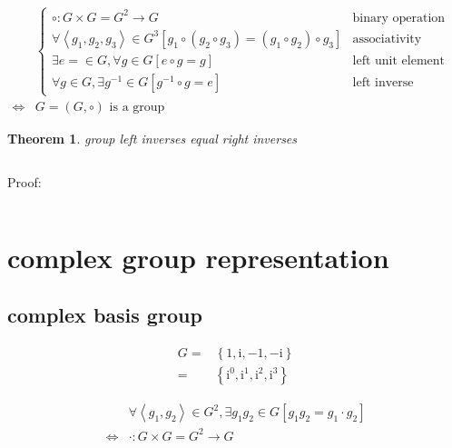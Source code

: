 \documentclass[
]{book}
\newtheorem{theorem}{Theorem}[chapter]
\theoremstyle{definition}
\theoremstyle{definition}
\theoremstyle{definition}
\theoremstyle{definition}
\theoremstyle{remark}
\begin{document}
\[
\begin{aligned}
 & \begin{cases}
\circ:G\times G=G^{2}\rightarrow G & \text{binary operation}\\
\forall\left\langle g_{{\scriptscriptstyle 1}},g_{{\scriptscriptstyle 2}},g_{{\scriptscriptstyle 3}}\right\rangle \in G^{3}\left[g_{{\scriptscriptstyle 1}}\circ\left(g_{{\scriptscriptstyle 2}}\circ g_{{\scriptscriptstyle 3}}\right)=\left(g_{{\scriptscriptstyle 1}}\circ g_{{\scriptscriptstyle 2}}\right)\circ g_{{\scriptscriptstyle 3}}\right] & \text{associativity}\\
\exists e=\in G,\forall g\in G\left[e\circ g=g\right] & \text{left unit element}\\
\forall g\in G,\exists g^{-1}\in G\left[g^{-1}\circ g=e\right] & \text{left inverse (element)}
\end{cases}\\
\Leftrightarrow & G=\left(G,\circ\right)\text{ is a group}
\end{aligned}
\]

\begin{theorem}
\protect\hypertarget{thm:unnamed-chunk-2}{}\label{thm:unnamed-chunk-2}group left inverses equal right inverses
\end{theorem}

\[
\
\]

Proof:

\[
\ \tag*{$\Box$}
\]

\section{complex group representation}\label{complex-group-representation}

\subsection{complex basis group}\label{complex-basis-group}

\[
\begin{aligned}
G= & \left\{ 1,\mathrm{i},-1,-\mathrm{i}\right\} \\
= & \left\{ \mathrm{i}^{0},\mathrm{i}^{1},\mathrm{i}^{2},\mathrm{i}^{3}\right\} 
\end{aligned}
\]

\[
\begin{aligned}
 & \forall\left\langle g_{{\scriptscriptstyle 1}},g_{{\scriptscriptstyle 2}}\right\rangle \in G^{2},\exists g_{{\scriptscriptstyle 1}}g_{{\scriptscriptstyle 2}}\in G\left[g_{{\scriptscriptstyle 1}}g_{{\scriptscriptstyle 2}}=g_{{\scriptscriptstyle 1}}\cdot g_{{\scriptscriptstyle 2}}\right]\\
\Leftrightarrow & \cdot:G\times G=G^{2}\rightarrow G
\end{aligned}
\]
\end{document}

